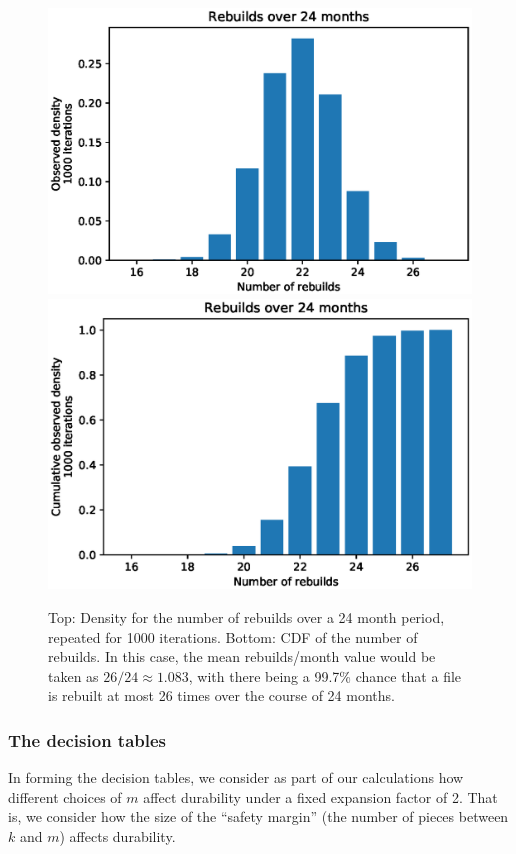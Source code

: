 \linespread{1}
\begin{figure}[h]
    \centering
    \includegraphics[scale=0.5]{RS-appendix-files/example_pmf.eps}
    \includegraphics[scale=0.5]{RS-appendix-files/example_cdf.eps}
    \caption{Top: Density for the number of rebuilds over a 24 month period, repeated for 1000 iterations. Bottom: CDF of the number of rebuilds. In this case, the mean rebuilds/month value would be taken as $26/24\approx1.083$, with there being a 99.7\% chance that a file is rebuilt at most 26 times over the course of 24 months.}
    \label{fig:sim_method}
\end{figure}

\pagebreak
\linespread{1}
\pagebreak
\subsubsection{The decision tables}
In forming the decision tables, we consider as part of our calculations how
different choices of $m$ affect durability under a fixed expansion factor of 2.
That is, we consider how the size of the ``safety margin'' (the number of 
pieces between $k$ and $m$) affects durability.



